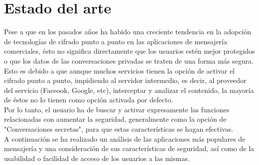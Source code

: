 \chapter{Estado del arte}

Pese a que en los pasados años ha habido una creciente tendencia en la adopción de tecnologías de cifrado punto a punto en las aplicaciones de mensajería comerciales, ésto no significa directamente que los usuarios estén mejor protegidos o que los datos de las conversaciones privadas se traten de una forma más segura. \\

Esto es debido a que aunque muchos servicios tienen la opción de activar el cifrado punto a punto, impidiendo al servidor intermedio, es decir, al proveedor del servicio (Faceook, Google, etc), interceptar y analizar el contenido, la mayoría de éstos no lo tienen como opción activada por defecto. \\

Por lo tanto, el usuario ha de buscar y activar expresamente las funciones relacionadas con aumentar la seguridad, generalmente como la opción de "Conversaciones secretas", para que estas características se hagan efectivas. \\

A continuación se ha realizado un análisis de las aplicaciones más populares de mensajería y una consideración de sus características de seguridad, así como de la usabilidad o facilidad de acceso de los usuarios a las mismas. \\

